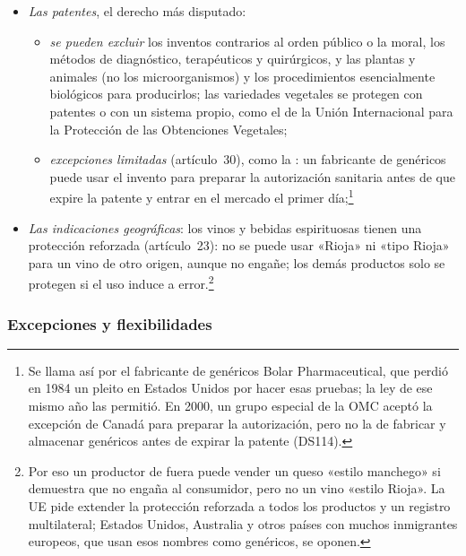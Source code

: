 \documentclass[11pt]{article}
\begin{document}
\begin{itemize}
\item \emph{Las patentes}, el derecho más disputado:
  \begin{itemize}
  \item \emph{se pueden excluir} los inventos contrarios al orden público o la moral, los métodos de diagnóstico, terapéuticos y quirúrgicos, y las plantas y animales (no los microorganismos) y los procedimientos esencialmente biológicos para producirlos; las variedades vegetales se protegen con patentes o con un sistema propio, como el de la Unión Internacional para la Protección de las Obtenciones Vegetales;
  \item \emph{excepciones limitadas} (artículo~30), como la : un fabricante de genéricos puede usar el invento para preparar la autorización sanitaria antes de que expire la patente y entrar en el mercado el primer día;\footnote{Se llama así por el fabricante de genéricos Bolar Pharmaceutical, que perdió en 1984 un pleito en Estados Unidos por hacer esas pruebas; la ley de ese mismo año las permitió. En 2000, un grupo especial de la OMC aceptó la excepción de Canadá para preparar la autorización, pero no la de fabricar y almacenar genéricos antes de expirar la patente (DS114).}
  \end{itemize}
\item \emph{Las indicaciones geográficas}: los vinos y bebidas espirituosas tienen una protección reforzada (artículo~23): no se puede usar «Rioja» ni «tipo Rioja» para un vino de otro origen, aunque no engañe; los demás productos solo se protegen si el uso induce a error.\footnote{Por eso un productor de fuera puede vender un queso «estilo manchego» si demuestra que no engaña al consumidor, pero no un vino «estilo Rioja». La UE pide extender la protección reforzada a todos los productos y un registro multilateral; Estados Unidos, Australia y otros países con muchos inmigrantes europeos, que usan esos nombres como genéricos, se oponen.}
\end{itemize}

\subsubsection{Excepciones y flexibilidades}\label{sec:adpic-excepciones}
\end{document}
